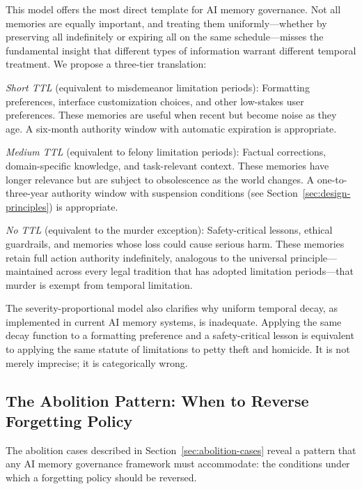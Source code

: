 \documentclass[12pt]{article}
\begin{document}
This model offers the most direct template for AI memory governance. Not all memories are equally important, and treating them uniformly---whether by preserving all indefinitely or expiring all on the same schedule---misses the fundamental insight that different types of information warrant different temporal treatment. We propose a three-tier translation:

\emph{Short TTL} (equivalent to misdemeanor limitation periods): Formatting preferences, interface customization choices, and other low-stakes user preferences. These memories are useful when recent but become noise as they age. A six-month authority window with automatic expiration is appropriate.

\emph{Medium TTL} (equivalent to felony limitation periods): Factual corrections, domain-specific knowledge, and task-relevant context. These memories have longer relevance but are subject to obsolescence as the world changes. A one-to-three-year authority window with suspension conditions (see Section~\ref{sec:design-principles}) is appropriate.

\emph{No TTL} (equivalent to the murder exception): Safety-critical lessons, ethical guardrails, and memories whose loss could cause serious harm. These memories retain full action authority indefinitely, analogous to the universal principle---maintained across every legal tradition that has adopted limitation periods---that murder is exempt from temporal limitation.

The severity-proportional model also clarifies why uniform temporal decay, as implemented in current AI memory systems, is inadequate. Applying the same decay function to a formatting preference and a safety-critical lesson is equivalent to applying the same statute of limitations to petty theft and homicide. It is not merely imprecise; it is categorically wrong.

\subsection{The Abolition Pattern: When to Reverse Forgetting Policy}
\label{sec:abolition-pattern}

The abolition cases described in Section~\ref{sec:abolition-cases} reveal a pattern that any AI memory governance framework must accommodate: the conditions under which a forgetting policy should be reversed.
\end{document}
